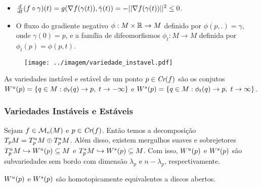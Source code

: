 \documentclass{beamer}
\begin{document}
\begin{footnotesize}
\begin{frame}
		\begin{minipage}[t]{0.67\linewidth}
		\begin{itemize}
			\item $\frac{d }{d t}(f \circ \gamma)(t) = g(\nabla f(\gamma(t)), \dot{\gamma}(t)) 
			=-||\nabla f(\gamma(t))||^{2}
			\leq 0$.
			
			\item O fluxo do gradiente negativo $\phi:M\times \mathbb{R}^{}
			\to M$ definido por $\phi(p,.) =\gamma$, onde $\gamma(0) = p$, e a família de difeomorfismos $\phi_{t}:M\to M$ definida por $\phi_{t}(p) = \phi(p,t)$.
		\end{itemize}	
		\end{minipage}
		\hfill%
		\begin{minipage}[t]{0.30\linewidth}
			\begin{figure}[!h]
				\centering
				\texttt{[image: ../imagem/variedade\_instavel.pdf]}
			\end{figure}
		\end{minipage}
		\begin{definicao}
			As variedades instável e estável de um ponto $p \in \textit{Cr}(f)$ são os conjutos $W^{u}(p) = \{q\in M: \phi_{t}(q) \to p,\; t\to -\infty\}$ e $W^{s}(p) = \{q\in M: \phi_{t}(q) \to p,\; t\to \infty\}$.
		\end{definicao}
		
	\end{frame}
	
	\begin{frame}
		\frametitle{Variedades Instáveis e Estáveis}
		\begin{teorema}
			Sejam $f \in \mathcal{M}_{o}(M)$ e $p \in \textit{Cr}(f)$. Então temos a decomposição $T_{p}M=T^{u}_{p}M\oplus T^{s}_{p}M$. Além disso, existem mergulhos suaves e sobrejetores $T^{u}_{p}M \hookrightarrow W^{u}(p) \subseteq M$ e $T^{s}_{p}M \hookrightarrow W^{s}(p) \subseteq M$. Com isso, $W^{u}(p)$ e $W^{s}(p)$ são subvariedades sem bordo com dimensão $\lambda_{p}$ e $n-\lambda_{p}$, respectivamente.
		\end{teorema}
	
		\begin{observacao}
			$W^{u}(p)$ e $W^{s}(p)$ são homotopicamente equivalentes a discos abertos.
		\end{observacao}
		

\end{frame}
\end{footnotesize}
\end{document}

